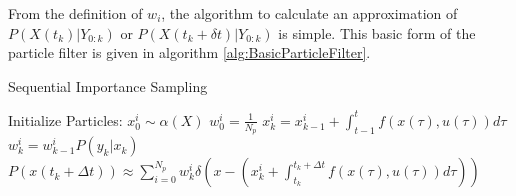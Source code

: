 From the definition of $w_i$, the algorithm to calculate
an approximation of $P(X(t_k) | Y_{0:k})$ or $P(X(t_k + \delta t) | Y_{0:k})$
is simple. This basic form of the particle filter is given in 
algorithm \autoref{alg:BasicParticleFilter}.

\begin{algorithm}
\caption{Sequential Importance Sampling}
\begin{algorithmic}
\STATE Initialize Particles:
    \STATE $x^i_0  \sim \alpha(X)$
    \STATE $w^i_0 = \frac{1}{N_p}$
\ENDFOR
{}
        \STATE $x^i_k = x^i_{k-1} + \int_{t-1}^t f(x(\tau), u(\tau)) d\tau $
        \STATE $w^i_k = w^i_{k-1}P(y_k | x_k)$
    \ENDFOR
\ENDFOR
\STATE $P(x(t_k+\Delta t)) \approx 
\sum_{i=0}^{N_p} w^i_k \delta\left(x - (x^i_k + \int_{t_k}^{t_k+\Delta t} f(x(\tau), u(\tau)) d\tau) \right)$
\end{algorithmic}
\label{alg:BasicParticleFilter}
\end{algorithm}

